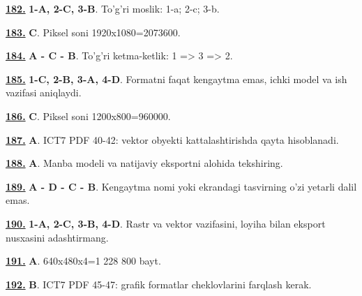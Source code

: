\documentclass[10pt,a4paper,oneside]{article}
\begin{document}
\noindent\hyperlink{q182}{\textbf{182.}} \textbf{1-A, 2-C, 3-B}.  To'g'ri moslik: 1-a; 2-c; 3-b.
\par\vspace{3mm}
\noindent\hyperlink{q183}{\textbf{183.}} \textbf{C}.  Piksel soni 1920x1080=2073600.
\par\vspace{3mm}
\noindent\hyperlink{q184}{\textbf{184.}} \textbf{A - C - B}.  To'g'ri ketma-ketlik: 1 =\textgreater{} 3 =\textgreater{} 2.
\par\vspace{3mm}
\noindent\hyperlink{q185}{\textbf{185.}} \textbf{1-C, 2-B, 3-A, 4-D}.  Formatni faqat kengaytma emas, ichki model va ish vazifasi aniqlaydi.
\par\vspace{3mm}
\noindent\hyperlink{q186}{\textbf{186.}} \textbf{C}.  Piksel soni 1200x800=960000.
\par\vspace{3mm}
\noindent\hyperlink{q187}{\textbf{187.}} \textbf{A}.  ICT7 PDF 40-42: vektor obyekti kattalashtirishda qayta hisoblanadi.
\par\vspace{3mm}
\noindent\hyperlink{q188}{\textbf{188.}} \textbf{A}.  Manba modeli va natijaviy eksportni alohida tekshiring.
\par\vspace{3mm}
\noindent\hyperlink{q189}{\textbf{189.}} \textbf{A - D - C - B}.  Kengaytma nomi yoki ekrandagi tasvirning o'zi yetarli dalil emas.
\par\vspace{3mm}
\noindent\hyperlink{q190}{\textbf{190.}} \textbf{1-A, 2-C, 3-B, 4-D}.  Rastr va vektor vazifasini, loyiha bilan eksport nusxasini adashtirmang.
\par\vspace{3mm}
\noindent\hyperlink{q191}{\textbf{191.}} \textbf{A}.  640x480x4=1 228 800 bayt.
\par\vspace{3mm}
\noindent\hyperlink{q192}{\textbf{192.}} \textbf{B}.  ICT7 PDF 45-47: grafik formatlar cheklovlarini farqlash kerak.
\par\vspace{3mm}
\end{document}
